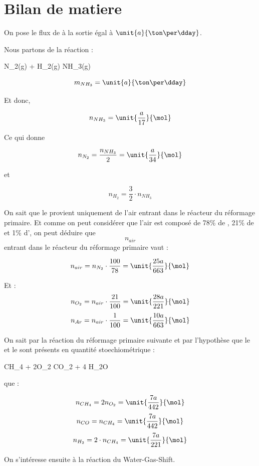 \documentclass{article}
\begin{document}
\section{Bilan de matiere}
On pose le flux de  à la sortie égal à $\unit{a}{\ton\per\dday}$. 

Nous partons de la réaction : 
\begin{chemmath}
		N_2(g) + H_2(g) \longrightarrow NH_3(g) 
\end{chemmath}
 	
$$m_{NH_3} = \unit{a}{\ton\per\dday}$$ 

Et donc, 
 
$$n_{NH_3} = \unit{\frac{a}{17}}{\mol}$$

Ce qui donne 

$$n_{N_2} = \frac{n_{NH_3}}{2} = \unit{\frac{a}{34}}{\mol}$$ 

et 

$$n_{H_2} = \frac{3}{2} \cdot n_{NH_3}$$

On sait que le  provient uniquement de l'air entrant 
dans le réacteur du  réformage primaire. Et comme on peut considérer
que l'air est composé de 78\% de , 21\% de 
et 1\% d', on peut déduire que $$n_{air}$$ entrant dans le 
réacteur du réformage primaire vaut : 

$$n_{air}= n_{N_2} \cdot \frac{100}{78} = \unit{\frac{25a}{663}}{\mol}$$ 

Et :
$$n_{O_2}= n_{air} \cdot \frac{21}{100} = \unit{\frac{28a}{221}}{\mol}$$
$$n_{Ar}= n_{air} \cdot \frac{1}{100} = \unit{\frac{10a}{663}}{\mol}$$

On sait par la réaction du réformage primaire suivante et par l'hypothèse que le
 et le  sont présents en quantité stoechiométrique : 

\begin{chemmath}
	CH_4 + 2O_2 \Longrightarrow CO_2 + 4 H_2O
\end{chemmath} 

que :

$$n_{CH_4} = 2n_{O_2} = \unit{\frac{7a}{442}}{\mol}$$
$$n_{CO} = n_{CH_4} =  \unit{\frac{7a}{442}} {\mol}$$
$$n_{H_2} = 2 \cdot n_{CH_4} =  \unit{\frac{7a}{221}}{\mol}$$

On s'intéresse ensuite à la réaction du Water-Gas-Shift.
\end{document}
